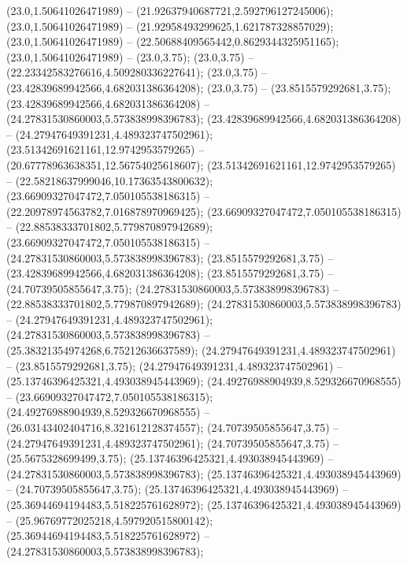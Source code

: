  (23.0,1.50641026471989) -- (21.92637940687721,2.592796127245006);
 (23.0,1.50641026471989) -- (21.92958493299625,1.621787328857029);
 (23.0,1.50641026471989) -- (22.50688409565442,0.8629344325951165);
 (23.0,1.50641026471989) -- (23.0,3.75);
 (23.0,3.75) -- (22.23342583276616,4.509280336227641);
 (23.0,3.75) -- (23.42839689942566,4.682031386364208);
 (23.0,3.75) -- (23.8515579292681,3.75);
 (23.42839689942566,4.682031386364208) -- (24.27831530860003,5.573838998396783);
 (23.42839689942566,4.682031386364208) -- (24.27947649391231,4.489323747502961);
 (23.51342691621161,12.9742953579265) -- (20.67778963638351,12.56754025618607);
 (23.51342691621161,12.9742953579265) -- (22.58218637999046,10.17363543800632);
 (23.66909327047472,7.050105538186315) -- (22.20978974563782,7.016878970969425);
 (23.66909327047472,7.050105538186315) -- (22.88538333701802,5.779870897942689);
 (23.66909327047472,7.050105538186315) -- (24.27831530860003,5.573838998396783);
 (23.8515579292681,3.75) -- (23.42839689942566,4.682031386364208);
 (23.8515579292681,3.75) -- (24.70739505855647,3.75);
 (24.27831530860003,5.573838998396783) -- (22.88538333701802,5.779870897942689);
 (24.27831530860003,5.573838998396783) -- (24.27947649391231,4.489323747502961);
 (24.27831530860003,5.573838998396783) -- (25.38321354974268,6.75212636637589);
 (24.27947649391231,4.489323747502961) -- (23.8515579292681,3.75);
 (24.27947649391231,4.489323747502961) -- (25.13746396425321,4.493038945443969);
 (24.49276988904939,8.529326670968555) -- (23.66909327047472,7.050105538186315);
 (24.49276988904939,8.529326670968555) -- (26.03143402404716,8.321612128374557);
 (24.70739505855647,3.75) -- (24.27947649391231,4.489323747502961);
 (24.70739505855647,3.75) -- (25.5675328699499,3.75);
 (25.13746396425321,4.493038945443969) -- (24.27831530860003,5.573838998396783);
 (25.13746396425321,4.493038945443969) -- (24.70739505855647,3.75);
 (25.13746396425321,4.493038945443969) -- (25.36944694194483,5.518225761628972);
 (25.13746396425321,4.493038945443969) -- (25.96769772025218,4.597920515800142);
 (25.36944694194483,5.518225761628972) -- (24.27831530860003,5.573838998396783);
